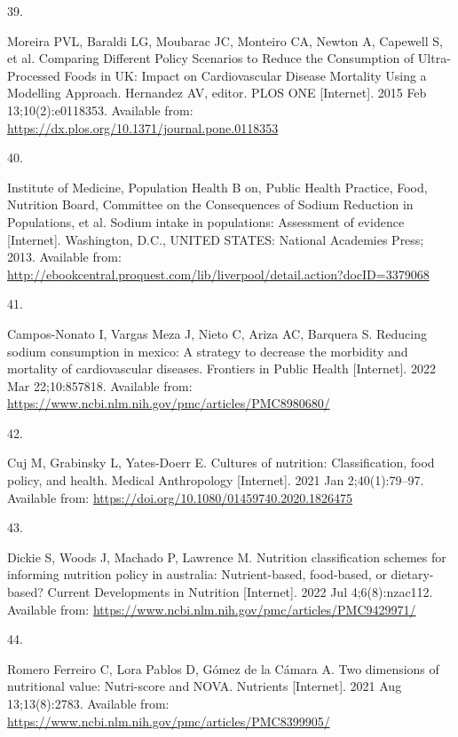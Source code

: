 \documentclass[
]{article}
\newlength{\cslhangindent}
\newlength{\csllabelwidth}
\newlength{\cslentryspacingunit} %
\newenvironment{CSLReferences}[2] %
 {%
  \setlength{\parindent}{0pt}
  \ifodd #1
  \let\oldpar\par
  \def\par{\hangindent=\cslhangindent\oldpar}
  \fi
  \setlength{\parskip}{#2\cslentryspacingunit}
 }%
 {}
\newcommand{\CSLLeftMargin}[1]{\parbox[t]{\csllabelwidth}{#1}}
\newcommand{\CSLRightInline}[1]{\parbox[t]{\linewidth - \csllabelwidth}{#1}\break}
\begin{document}
\begin{CSLReferences}{0}{0}
\leavevmode{}%
\CSLLeftMargin{39. }%
\CSLRightInline{Moreira PVL, Baraldi LG, Moubarac JC, Monteiro CA,
Newton A, Capewell S, et al. Comparing Different Policy Scenarios to
Reduce the Consumption of Ultra-Processed Foods in UK: Impact on
Cardiovascular Disease Mortality Using a Modelling Approach. Hernandez
AV, editor. PLOS ONE {[}Internet{]}. 2015 Feb 13;10(2):e0118353.
Available from: \url{https://dx.plos.org/10.1371/journal.pone.0118353}}

\leavevmode{}%
\CSLLeftMargin{40. }%
\CSLRightInline{Institute of Medicine, Population Health B on, Public
Health Practice, Food, Nutrition Board, Committee on the Consequences of
Sodium Reduction in Populations, et al. Sodium intake in populations:
Assessment of evidence {[}Internet{]}. Washington, D.C., UNITED STATES:
National Academies Press; 2013. Available from:
\url{http://ebookcentral.proquest.com/lib/liverpool/detail.action?docID=3379068}}

\leavevmode{}%
\CSLLeftMargin{41. }%
\CSLRightInline{Campos-Nonato I, Vargas Meza J, Nieto C, Ariza AC,
Barquera S. Reducing sodium consumption in mexico: A strategy to
decrease the morbidity and mortality of cardiovascular diseases.
Frontiers in Public Health {[}Internet{]}. 2022 Mar 22;10:857818.
Available from:
\url{https://www.ncbi.nlm.nih.gov/pmc/articles/PMC8980680/}}

\leavevmode{}%
\CSLLeftMargin{42. }%
\CSLRightInline{Cuj M, Grabinsky L, Yates-Doerr E. Cultures of
nutrition: Classification, food policy, and health. Medical Anthropology
{[}Internet{]}. 2021 Jan 2;40(1):79--97. Available from:
\url{https://doi.org/10.1080/01459740.2020.1826475}}

\leavevmode{}%
\CSLLeftMargin{43. }%
\CSLRightInline{Dickie S, Woods J, Machado P, Lawrence M. Nutrition
classification schemes for informing nutrition policy in australia:
Nutrient-based, food-based, or dietary-based? Current Developments in
Nutrition {[}Internet{]}. 2022 Jul 4;6(8):nzac112. Available from:
\url{https://www.ncbi.nlm.nih.gov/pmc/articles/PMC9429971/}}

\leavevmode{}%
\CSLLeftMargin{44. }%
\CSLRightInline{Romero Ferreiro C, Lora Pablos D, Gómez de la Cámara A.
Two dimensions of nutritional value: Nutri-score and NOVA. Nutrients
{[}Internet{]}. 2021 Aug 13;13(8):2783. Available from:
\url{https://www.ncbi.nlm.nih.gov/pmc/articles/PMC8399905/}}


\end{CSLReferences}
\end{document}
